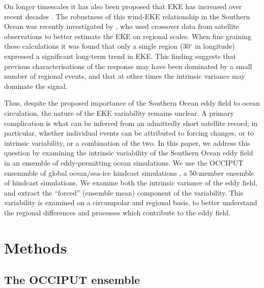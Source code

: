\documentclass{agujournal2019}
\begin{document}
On longer timescales it has also been proposed that EKE has increased over recent decades \citep{Hogg2015, Martinez-Moreno2019}.
The robustness of this wind-EKE relationship in the Southern Ocean was recently investigated by \citet{Zhang2021}, who used crossover data from satellite observations \citep[as in][]{Hogg2015} to better estimate the EKE on regional scales. 
When fine graining these calculations it was found that only a single region (30$^\circ$ in longitude) expressed a significant long-term trend in EKE.
This finding  suggests that previous characterisations of the response may have been dominated by a small number of regional events, and that at other times the intrinsic variance may dominate the signal.

Thus, despite the proposed importance of the Southern Ocean eddy field to ocean circulation, the nature of the EKE variability remains unclear.
A primary complication is what can be inferred from an admittedly short satellite record; in particular, whether individual events can be attributed to forcing changes, or to intrinsic variability, or a combination of the two.
In this paper, we address this question by examining the intrinsic variability of the Southern Ocean eddy field in an ensemble of eddy-permitting ocean simulations.
We use the OCCIPUT ensemmble of global ocean/sea-ice hindcast simulations \citep{Penduff-etal-2014, Leroux2018}, a 50-member ensemble of hindcast simulations.
We examine both the intrinsic variance of the eddy field, and extract the ``forced'' (ensemble mean) component of the variability.
This variability is examined on a circumpolar and regional basis, to better understand the regional differences and processes which contribute to the eddy field.



\section{Methods}

\subsection{The OCCIPUT ensemble}
\end{document}
